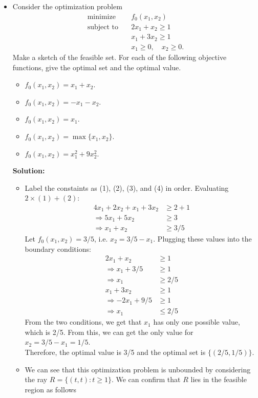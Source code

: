 \documentclass{article}
\begin{document}
\begin{itemize}
  \item[4.1] Consider the optimization problem
  \begin{align*}
    \text{minimize} \quad & f_0(x_1, x_2) \\
    \text{subject to} \quad & 2x_1 + x_2 \ge 1 \\
    & x_1 + 3x_2 \ge 1 \\
    & x_1 \ge 0, \quad x_2 \ge 0.
  \end{align*}
  Make a sketch of the feasible set. For each of the following objective functions, give the optimal set and the optimal value.
  \begin{itemize}
    \item[(a)] $f_0(x_1, x_2) = x_1 + x_2$.
    \item[(b)] $f_0(x_1, x_2) = -x_1 - x_2$.
    \item[(c)] $f_0(x_1, x_2) = x_1$.
    \item[(d)] $f_0(x_1, x_2) = \max\{x_1, x_2\}.$
    \item[(e)] $f_0(x_1, x_2) = x_1^2 + 9x_2^2.$
  \end{itemize}
  \textbf{Solution:}
  \begin{itemize}
    \item[(a)] Label the constaints as (1), (2), (3), and (4) in order. Evaluating $2 \times (1) + (2)$:
    \begin{align*}
      4 x_1 + 2 x_2 + x_1 + 3 x_2 &\ge 2 + 1 \\
      \Rightarrow 5 x_1 + 5 x_2 &\ge 3 \\
      \Rightarrow x_1 + x_2 &\ge 3/5
    \end{align*}
    Let $f_0(x_1, x_2) = 3/5$, i.e. $x_2 = 3/5 - x_1$.
    Plugging these values into the boundary conditions:
    \begin{align*}
      2 x_1 + x_2 &\ge 1 \\
      \Rightarrow x_1 + 3/5 &\ge 1 \\
      \Rightarrow x_1 &\ge 2/5 \\
      x_1 + 3 x_2 &\ge 1 \\
      \Rightarrow -2 x_1 + 9/5 &\ge 1 \\
      \Rightarrow x_1 &\le 2/5
    \end{align*}
    From the two conditions, we get that $x_1$ has only one possible value, which is 2/5. From this, we can get the only value for $x_2 = 3/5 - x_1 = 1/5$. \\
    Therefore, the optimal value is 3/5 and the optimal set is $\{(2/5, 1/5)\}$.
    \item[(b)] We can see that this optimization problem is unbounded by considering the ray $R = \{(t, t) : t \ge 1\}$. We can confirm that $R$ lies in the feasible region as follows

\end{itemize}
\end{itemize}
\end{document}
